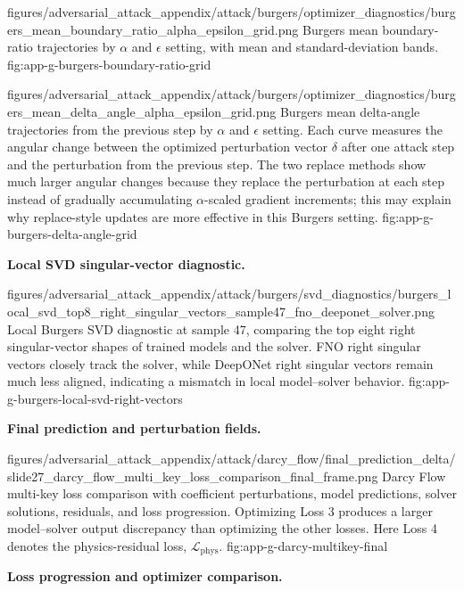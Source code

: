 \documentclass[letterpaper]{article} %
\newcounter{appendixsection}
\newcounter{appendixsubsection}[appendixsection]
\newcounter{appendixdomain}[appendixsubsection]
\begin{document}
\appendixattackfig
  {figures/adversarial_attack_appendix/attack/burgers/optimizer_diagnostics/burgers_mean_boundary_ratio_alpha_epsilon_grid.png}
  {Burgers mean boundary-ratio trajectories by $\alpha$ and $\epsilon$ setting,
  with mean and standard-deviation bands.}
  {fig:app-g-burgers-boundary-ratio-grid}

\appendixattackfig
  {figures/adversarial_attack_appendix/attack/burgers/optimizer_diagnostics/burgers_mean_delta_angle_alpha_epsilon_grid.png}
  {Burgers mean delta-angle trajectories from the previous step by $\alpha$ and
  $\epsilon$ setting. Each curve measures the angular change between the
  optimized perturbation vector $\delta$ after one attack step and the
  perturbation from the previous step. The two replace methods show much larger
  angular changes because they replace the perturbation at each step instead of
  gradually accumulating $\alpha$-scaled gradient increments; this may explain
  why replace-style updates are more effective in this Burgers setting.}
  {fig:app-g-burgers-delta-angle-grid}

\noindent\textbf{Local SVD singular-vector diagnostic.}

\appendixattackfig
  {figures/adversarial_attack_appendix/attack/burgers/svd_diagnostics/burgers_local_svd_top8_right_singular_vectors_sample47_fno_deeponet_solver.png}
  {Local Burgers SVD diagnostic at sample 47, comparing the top eight right
  singular-vector shapes of trained models and the solver. FNO right singular
  vectors closely track the solver, while DeepONet right singular vectors remain
  much less aligned, indicating a mismatch in local model--solver behavior.}
  {fig:app-g-burgers-local-svd-right-vectors}

\FloatBarrier
{}

\noindent\textbf{Final prediction and perturbation fields.}

\appendixattackfig
  {figures/adversarial_attack_appendix/attack/darcy_flow/final_prediction_delta/slide27_darcy_flow_multi_key_loss_comparison_final_frame.png}
  {Darcy Flow multi-key loss comparison with coefficient perturbations, model
  predictions, solver solutions, residuals, and loss progression. Optimizing
  Loss 3 produces a larger model--solver output discrepancy than optimizing the
  other losses. Here Loss 4 denotes the physics-residual loss,
  $\mathcal{L}_{\mathrm{phys}}$.}
  {fig:app-g-darcy-multikey-final}

\clearpage
\noindent\textbf{Loss progression and optimizer comparison.}
\end{document}
